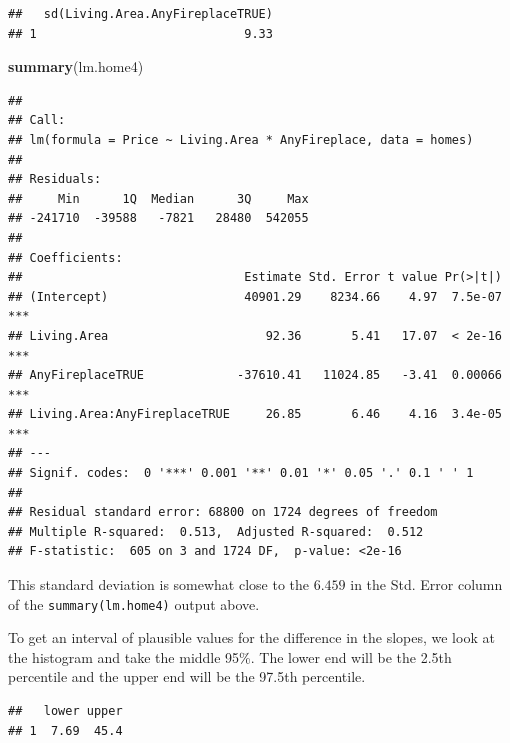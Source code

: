 \documentclass[]{book}
\newenvironment{Shaded}{\begin{snugshade}}{\end{snugshade}}
\newcommand{\DataTypeTok}[1]{\textcolor[rgb]{0.13,0.29,0.53}{#1}}
\newcommand{\FloatTok}[1]{\textcolor[rgb]{0.00,0.00,0.81}{#1}}
\newcommand{\KeywordTok}[1]{\textcolor[rgb]{0.13,0.29,0.53}{\textbf{#1}}}
\newcommand{\NormalTok}[1]{#1}
\newcommand{\OperatorTok}[1]{\textcolor[rgb]{0.81,0.36,0.00}{\textbf{#1}}}
\newcommand{\StringTok}[1]{\textcolor[rgb]{0.31,0.60,0.02}{#1}}
\begin{document}
\begin{verbatim}
##   sd(Living.Area.AnyFireplaceTRUE)
## 1                             9.33
\end{verbatim}

\begin{Shaded}
\begin{Highlighting}[]
\KeywordTok{summary}\NormalTok{(lm.home4)}
\end{Highlighting}
\end{Shaded}

\begin{verbatim}
## 
## Call:
## lm(formula = Price ~ Living.Area * AnyFireplace, data = homes)
## 
## Residuals:
##     Min      1Q  Median      3Q     Max 
## -241710  -39588   -7821   28480  542055 
## 
## Coefficients:
##                               Estimate Std. Error t value Pr(>|t|)    
## (Intercept)                   40901.29    8234.66    4.97  7.5e-07 ***
## Living.Area                      92.36       5.41   17.07  < 2e-16 ***
## AnyFireplaceTRUE             -37610.41   11024.85   -3.41  0.00066 ***
## Living.Area:AnyFireplaceTRUE     26.85       6.46    4.16  3.4e-05 ***
## ---
## Signif. codes:  0 '***' 0.001 '**' 0.01 '*' 0.05 '.' 0.1 ' ' 1
## 
## Residual standard error: 68800 on 1724 degrees of freedom
## Multiple R-squared:  0.513,  Adjusted R-squared:  0.512 
## F-statistic:  605 on 3 and 1724 DF,  p-value: <2e-16
\end{verbatim}

This standard deviation is somewhat close to the \(6.459\) in the Std. Error column of the \texttt{summary(lm.home4)} output above.

To get an interval of plausible values for the difference in the slopes, we look at the histogram and take the middle 95\%. The lower end will be the 2.5th percentile and the upper end will be the 97.5th percentile.

\begin{Shaded}
\end{Shaded}

\begin{verbatim}
##   lower upper
## 1  7.69  45.4
\end{verbatim}
\end{document}
